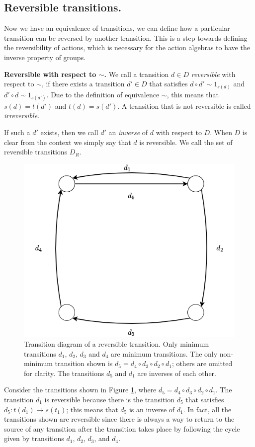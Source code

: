 \subsection{Reversible transitions.}

Now we have an equivalence of transitions, we can define how a particular transition can be reversed by another transition.
This is a step towards defining the reversibility of actions, which is necessary for the action algebras to have the inverse property of groups.


\textbf{Reversible with respect to $\sim$.}
We call a transition $d \in D$ \textit{reversible} with respect to $\sim$, if there exists a transition $d' \in D$ that satisfies  $d \circ d' \sim 1_{s(d)}$ and $d' \circ d \sim 1_{s(d')}$.
Due to the definition of equivalence $\sim$, this means that $s(d)=t(d')$ and $t(d)=s(d')$.
A transition that is not reversible is called \textit{irreversible}.

If such a $d'$ exists, then we call $d'$ an \textit{inverse} of $d$ with respect to $D$.
When $D$ is clear from the context we simply say that $d$ is reversible.
We call the set of reversible transitions $D_{R}$.

\begin{figure}
    \centering
    \includegraphics[width=0.5\linewidth]{ToUse/Paper discards/Images/reversible-composition.png}
    \caption{    
    Transition diagram of a reversible transition.
    Only minimum transitions $d_{1}$, $d_{2}$, $d_{3}$ and $d_{4}$ are minimum transitions.
    The only non-minimum transition shown is $d_{5} = d_{4} \circ d_{3} \circ d_{2} \circ d_{1}$; others are omitted for clarity.
    The transitions $d_{5}$ and $d_{1}$ are inverses of each other.
    }
    \label{fig:reversible-composition}
\end{figure}

Consider the transitions shown in Figure \ref{fig:reversible-composition}, where $d_{5} = d_{4} \circ d_{3} \circ d_{2} \circ d_{1}$.
The transition $d_{1}$ is reversible because there is the transition $d_{5}$ that satisfies $d_{5}: t(d_{1}) \xrightarrow{} s(t_{1})$; this means that $d_{5}$ is an inverse of $d_{1}$.
In fact, all the transitions shown are reversible since there is always a way to return to the source of any transition after the transition takes place by following the cycle given by transitions $d_{1}$, $d_{2}$, $d_{3}$, and $d_{4}$.


